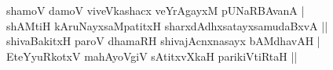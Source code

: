 \begin{entry}
\smallskip
\begin{shl}
shamoV damoV viveVkashacx veYrAgayxM pUNaRBAvanA |\\[1pt]
shAMtiH kAruNayxsaMpatitxH sharxdAdhxsatayxsamudaBxvA ||\\[1pt]
shivaBakitxH paroV dhamaRH shivajAcnxnasayx bAMdhavAH |\\[1pt]
EteYyuRkotxV mahAyoVgiV sAtitxvXkaH parikiVtiRtaH ||
\end{shl}
\smallskip
{}
\end{entry}



